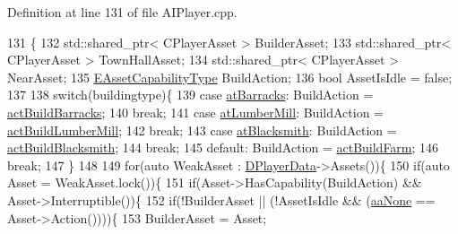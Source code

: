 Definition at line 131 of file A\+I\+Player.\+cpp.


\begin{DoxyCode}
131                                                                                                          \{
132     std::shared\_ptr< CPlayerAsset > BuilderAsset;
133     std::shared\_ptr< CPlayerAsset > TownHallAsset;
134     std::shared\_ptr< CPlayerAsset > NearAsset;
135     \hyperlink{GameDataTypes_8h_a35b98ce26aca678b03c6f9f76e4778ce}{EAssetCapabilityType} BuildAction;
136     \textcolor{keywordtype}{bool} AssetIsIdle = \textcolor{keyword}{false};
137     
138     \textcolor{keywordflow}{switch}(buildingtype)\{
139         \textcolor{keywordflow}{case} \hyperlink{GameDataTypes_8h_a5600d4fc433b83300308921974477feca1cbf6c944f30d615a247eef1f57b2230}{atBarracks}:    BuildAction = \hyperlink{GameDataTypes_8h_a35b98ce26aca678b03c6f9f76e4778ceaea47e79df21160eb97064a18e6d36cac}{actBuildBarracks};
140                             \textcolor{keywordflow}{break};
141         \textcolor{keywordflow}{case} \hyperlink{GameDataTypes_8h_a5600d4fc433b83300308921974477feca7bb38316bc3193b5c9ec67ea6aad549c}{atLumberMill}:  BuildAction = \hyperlink{GameDataTypes_8h_a35b98ce26aca678b03c6f9f76e4778ceaea7fb8009561a58e7b9f2cf741989242}{actBuildLumberMill};
142                             \textcolor{keywordflow}{break};
143         \textcolor{keywordflow}{case} \hyperlink{GameDataTypes_8h_a5600d4fc433b83300308921974477feca2b2badd6cba3212eef87ac295bf9642e}{atBlacksmith}:  BuildAction = \hyperlink{GameDataTypes_8h_a35b98ce26aca678b03c6f9f76e4778cea45224b077989530810879da4e225eac7}{actBuildBlacksmith};
144                             \textcolor{keywordflow}{break};
145         \textcolor{keywordflow}{default}:            BuildAction = \hyperlink{GameDataTypes_8h_a35b98ce26aca678b03c6f9f76e4778cea4de8df4d0a9c3bb6fe33e380bc407078}{actBuildFarm};
146                             \textcolor{keywordflow}{break};
147     \}
148 
149     \textcolor{keywordflow}{for}(\textcolor{keyword}{auto} WeakAsset : \hyperlink{classCAIPlayer_a83b5113c8f7e80df54940b647c5ee2e6}{DPlayerData}->Assets())\{
150         \textcolor{keywordflow}{if}(\textcolor{keyword}{auto} Asset = WeakAsset.lock())\{
151             \textcolor{keywordflow}{if}(Asset->HasCapability(BuildAction) && Asset->Interruptible())\{
152                 \textcolor{keywordflow}{if}(!BuilderAsset || (!AssetIsIdle && (\hyperlink{GameDataTypes_8h_ab47668e651a3032cfb9c40ea2d60d670ac17cc5a0035320c060d7f8074143b507}{aaNone} == Asset->Action())))\{
153                     BuilderAsset = Asset;

\end{DoxyCode}
